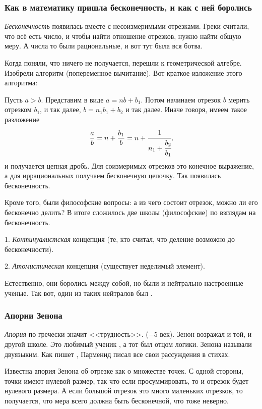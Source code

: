 \documentclass[a4paper,oneside,fleqn,10pt]{article}
\begin{document}
\subsubsection{Как в математику пришла бесконечность, и как с ней боролись}

\emph{Бесконечность} появилась вместе с несоизмеримыми отрезками.
Греки считали, что всё есть число, и чтобы найти отношение отрезков, нужно найти общую
меру. А числа то были рациональные, и вот тут была вся ботва.

Когда поняли, что ничего не получается, перешли к геометрической алгебре.
Изобрели алгоритм  (попеременное вычитание). Вот краткое изложение
этого алгоритма:

Пусть $a > b$. Представим в виде $a = nb + b_1$. Потом начинаем отрезок $b$
мерить отрезком $b_1$, и так далее, $b = n_1b_1 + b_2$ и так далее.
Иначе говоря, имеем такое разложение
$$\frac ab = n + \frac{b_1}{b}  = n + \cfrac{1}{n_1 + \cfrac{b_2}{b_1}},$$
и получается цепная дробь. Для соизмеримых отрезков это конечное выражение, а для иррациональных
получаем бесконечную цепочку.
Так появилась бесконечность.

Кроме того, были философские вопросы: а из чего состоит отрезок, можно ли его бесконечно делить?
В итоге сложилось две школы (философские) по взглядам на бесконечность.

1. \emph{Континуалистская} концепция (те, кто считал, что деление возможно до бесконечности).

2. \emph{Атомистическая} концепция (существует неделимый элемент).

Естественно, они боролись между собой, но были и нейтрально настроенные ученые.
Так вот, один из таких нейтралов был .

\subsubsection{Апории Зенона}

\emph{Апория} по гречески значит <<трудность>>.  ($-5$ век).
Зенон возражал и той, и другой школе.
Это любимый ученик , а тот был отцом логики.
Зенона называли двуязыким.
Как пишет , Парменид писал все свои рассуждения в стихах.

Известна апория Зенона об отрезке как о множестве точек.
С одной стороны, точки имеют нулевой размер,
так что если просуммировать, то и отрезок будет нулевого размера. А если большой отрезок
это много маленьких отрезков, то получается,
что мера всего должна быть бесконечной, что тоже неверно.
\end{document}
